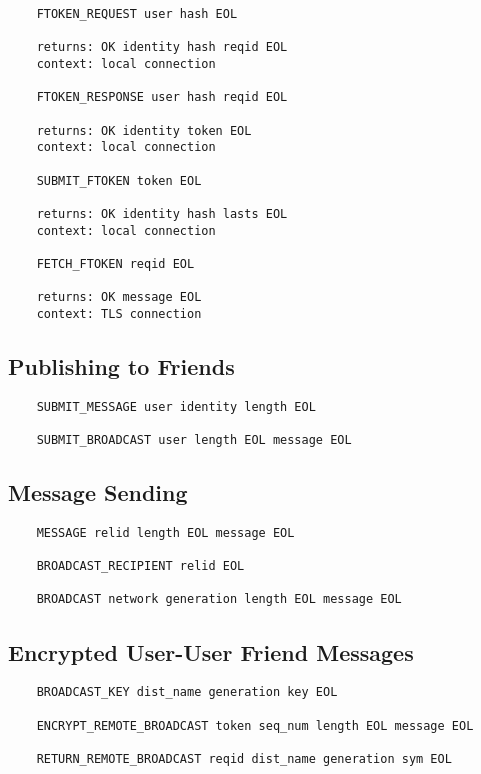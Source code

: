 \documentclass[letterpaper,11pt,oneside]{article}
\begin{document}
\vspace{10pt}
\begin{verbatim}
    FTOKEN_REQUEST user hash EOL 

    returns: OK identity hash reqid EOL
    context: local connection

    FTOKEN_RESPONSE user hash reqid EOL 

    returns: OK identity token EOL
    context: local connection

    SUBMIT_FTOKEN token EOL 

    returns: OK identity hash lasts EOL
    context: local connection

    FETCH_FTOKEN reqid EOL

    returns: OK message EOL
    context: TLS connection
\end{verbatim}

\subsection{Publishing to Friends}

\vspace{10pt}
\begin{verbatim}
    SUBMIT_MESSAGE user identity length EOL

    SUBMIT_BROADCAST user length EOL message EOL
\end{verbatim}

\subsection{Message Sending}

\vspace{10pt}
\begin{verbatim}
    MESSAGE relid length EOL message EOL

    BROADCAST_RECIPIENT relid EOL

    BROADCAST network generation length EOL message EOL
\end{verbatim}

\subsection{Encrypted User-User Friend Messages}

\vspace{10pt}
\begin{verbatim}
    BROADCAST_KEY dist_name generation key EOL

    ENCRYPT_REMOTE_BROADCAST token seq_num length EOL message EOL

    RETURN_REMOTE_BROADCAST reqid dist_name generation sym EOL
\end{verbatim}
\end{document}
